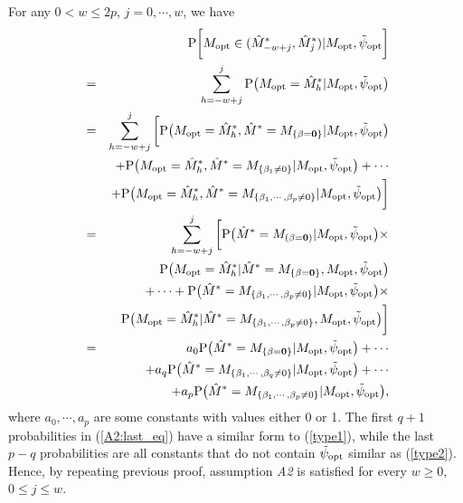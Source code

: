 \documentclass[10pt]{book}
\theoremstyle{definition}
\begin{document}
For any $0<w \leq 2p$, $j=0, \cdots, w$, we have
\begin{eqnarray}
   &&{\rm P}\bigg[M_{\rm opt}\in(\hat{M}_{-w+j}^{*},\hat{M}_{j}^{*})|M_{\rm opt},\tilde{\psi}_{\rm opt} \bigg]\nonumber\\
   &=&\sum_{h=-w+j}^j {\rm P}\big(M_{\rm opt}=\hat{M}^*_h|M_{\rm opt},\tilde{\psi}_{\rm opt}\big)\nonumber\\
    &=&\sum_{h=-w+j}^j \bigg[{\rm P}\big(M_{\rm opt}=\hat{M}^*_h, \hat{M}^* = M_{\{\bf{\beta}=\mathbf{0}\}}|M_{\rm opt},\tilde{\psi}_{\rm opt}\big)\nonumber\\
    &&+{\rm P}\big(M_{\rm opt}=\hat{M}^*_h, \hat{M}^* = M_{\{\beta_1 \neq0\}}|M_{\rm opt},\tilde{\psi}_{\rm opt}\big)+\cdots \nonumber\\
    &&+{\rm P}\big(M_{\rm opt}=\hat{M}^*_h, \hat{M}^* = M_{\{\beta_1, \cdots, \beta_p \neq0\}}|M_{\rm opt},\tilde{\psi}_{\rm opt}\big)\bigg]\nonumber\\
    &=& \sum_{h=-w+j}^j \bigg[{\rm P}\big(\hat{M}^* = M_{(\beta=\mathbf{0})}|M_{\rm opt},\tilde{\psi}_{\rm opt}\big) \times \nonumber \\
    &&{\rm P}\big(M_{\rm opt}=\hat{M}^*_h|\hat{M}^* = M_{\{\beta=\mathbf{0}\}},M_{\rm opt},\tilde{\psi}_{\rm opt}\big) \nonumber\\
    &&+ \cdots+{\rm P}\big(\hat{M}^* = M_{\{\beta_1, \cdots, \beta_{p} \neq0\}}|M_{\rm opt},\tilde{\psi}_{\rm opt}\big)
    \times \nonumber \\
    &&{\rm P}\big(M_{\rm opt}=\hat{M}^*_h|\hat{M}^* = M_{\{\beta_1, \cdots, \beta_{p} \neq0\}},M_{\rm opt},\tilde{\psi}_{\rm opt}\big)\bigg]\nonumber\\
    &=& a_0{\rm P}\big( \hat{M}^* = M_{\{\mathbf{\beta}=\mathbf{0}\}}|M_{\rm opt},\tilde{\psi}_{\rm opt}\big)+ \cdots\nonumber\\
     &&+a_q{\rm P}\big(\hat{M}^* = M_{\{\beta_1, \cdots, \beta_{q} \neq0\}}|M_{\rm opt},\tilde{\psi}_{\rm opt}\big)+\cdots \nonumber\\
    &&+a_p{\rm P}\big(\hat{M}^* = M_{\{\beta_1, \cdots, \beta_p \neq0\}}|M_{\rm opt},\tilde{\psi}_{\rm opt}\big),\label{A2:last_eq}
\end{eqnarray}
where $a_0,\cdots,a_p$ are some constants with values either 0 or 1. The first $q+1$ probabilities in (\ref{A2:last_eq}) have a similar form to (\ref{type1}), while the last $p-q$ probabilities are all constants that do not contain $\tilde{\psi}_{\rm opt}$ similar as (\ref{type2}).  Hence, by repeating previous proof, assumption {\it A2} is satisfied for every $w\geq 0$, $0\leq j \leq w$. 
\end{document}
